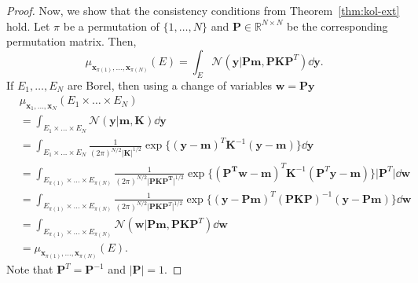 \begin{proof}
    Now, we show that the consistency conditions from Theorem~\ref{thm:kol-ext} hold.
    Let $\pi$ be a permutation of $\{ 1, \dots, N \}$ and $\mathbf{P} \in \mathbb{R}^{N \times N}$ be the corresponding permutation matrix.
    Then,
    \begin{equation*}
        \mu_{\mathbf{x}_{\pi(1)}, \dots, \mathbf{x}_{\pi(N)}}(E) =
        \int_{E} \mathcal{N}(\mathbf{y} | \mathbf{Pm}, \mathbf{P} \mathbf{K} \mathbf{P}^{T}) \dd \mathbf{y}.
    \end{equation*}
    If $E_1, \dots, E_N$ are Borel, then using a change of variables $\mathbf{w} = \mathbf{Py}$
    \begin{align*}
        & \mu_{\mathbf{x}_1, \dots, \mathbf{x}_N}(E_1 \times \dots \times E_N) \\
        & = \int_{E_1 \times \dots \times E_N} \mathcal{N}(\mathbf{y} | \mathbf{m}, \mathbf{K}) \dd \mathbf{y} \\
        & = \int_{E_1 \times \dots \times E_N}
        \frac{ 1 }{ (2 \pi)^{N/2} \lvert \mathbf{K} \rvert^{1/2} }
        \exp \{ (\mathbf{y} - \mathbf{m})^{T} \mathbf{K}^{-1} (\mathbf{y} - \mathbf{m}) \}
        \dd \mathbf{y} \\
        & = \int_{E_{\pi(1)} \times \dots \times E_{\pi(N)}}
        \frac{ 1 }{ (2 \pi)^{N/2} \lvert \mathbf{PKP^T} \rvert^{1/2} }
        \exp \{ (\mathbf{P^Tw} - \mathbf{m})^{T} \mathbf{K}^{-1} (\mathbf{P}^{T}\mathbf{y} - \mathbf{m}) \}
        \lvert \mathbf{P}^{T} \rvert \dd \mathbf{w} \\
        & = \int_{E_{\pi(1)} \times \dots \times E_{\pi(N)}}
        \frac{ 1 }{ (2 \pi)^{N/2} \lvert \mathbf{PKP}^T \rvert^{1/2} }
        \exp \{ (\mathbf{y} - \mathbf{Pm})^{T} (\mathbf{P}\mathbf{K} \mathbf{P})^{-1} (\mathbf{y} - \mathbf{P}\mathbf{m}) \} \dd \mathbf{w} \\
        & = \int_{E_{\pi(1)} \times \dots \times E_{\pi(N)}}
        \mathcal{N}(\mathbf{w} | \mathbf{Pm}, \mathbf{P} \mathbf{K} \mathbf{P}^{T}) \dd \mathbf{w} \\
        & = \mu_{\mathbf{x}_{\pi(1)}, \dots, \mathbf{x}_{\pi(N)}}(E).
    \end{align*}
    Note that $\mathbf{P}^{T} = \mathbf{P}^{-1}$ and $\lvert \mathbf{P} \rvert = 1$.


\end{proof}
